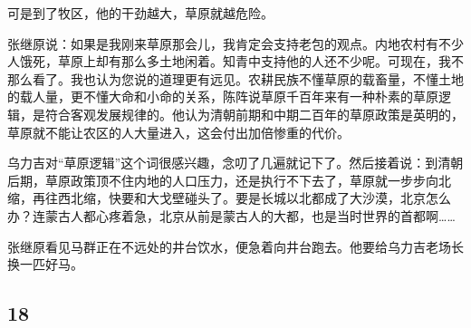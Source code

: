 \par 可是到了牧区，他的干劲越大，草原就越危险。
\par 张继原说：如果是我刚来草原那会儿，我肯定会支持老包的观点。内地农村有不少人饿死，草原上却有那么多土地闲着。知青中支持他的人还不少呢。可现在，我不那么看了。我也认为您说的道理更有远见。农耕民族不懂草原的载畜量，不懂土地的载人量，更不懂大命和小命的关系，陈阵说草原千百年来有一种朴素的草原逻辑，是符合客观发展规律的。他认为清朝前期和中期二百年的草原政策是英明的，草原就不能让农区的人大量进入，这会付出加倍惨重的代价。
\par 乌力吉对“草原逻辑”这个词很感兴趣，念叨了几遍就记下了。然后接着说：到清朝后期，草原政策顶不住内地的人口压力，还是执行不下去了，草原就一步步向北缩，再往西北缩，快要和大戈壁碰头了。要是长城以北都成了大沙漠，北京怎么办？连蒙古人都心疼着急，北京从前是蒙古人的大都，也是当时世界的首都啊……
\par 张继原看见马群正在不远处的井台饮水，便急着向井台跑去。他要给乌力吉老场长换一匹好马。




\subsection*{18}



